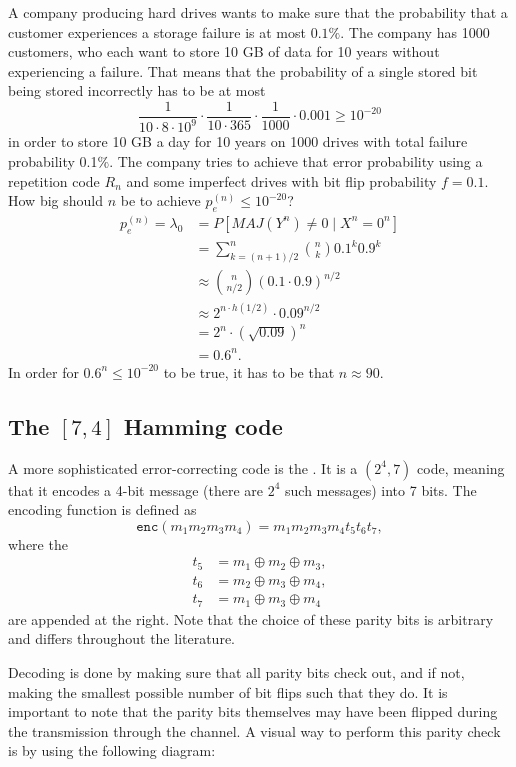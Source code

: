 \begin{example}
A company producing hard drives wants to make sure that the probability that a customer experiences a storage failure is at most $0.1\%$. The company has 1000 customers, who each want to store 10 GB of data for 10 years without experiencing a failure. That means that the probability of a single stored bit being stored incorrectly has to be at most
\[
\frac{1}{10 \cdot 8 \cdot 10^9} \cdot \frac{1}{10 \cdot 365} \cdot \frac{1}{1000} \cdot 0.001 \geq 10^{-20}
\]
in order to store 10 GB a day for 10 years on 1000 drives with total failure probability 0.1$\%$. The company tries to achieve that error probability using a repetition code $R_n$ and some imperfect drives with bit flip probability $f = 0.1$. How big should $n$ be to achieve $p_e^{(n)} \leq 10^{-20}$?
\begin{align*}
p_e^{(n)} = \lambda_0 &= P[MAJ(Y^n) \neq 0 \mid X^n = 0^n]\\
&= \sum_{k = (n+1)/2}^n {n \choose k} 0.1^k 0.9^k\\
&\approx {n \choose n/2} \left(0.1\cdot 0.9\right)^{n/2}\\
&\approx 2^{n\cdot h(1/2)} \cdot 0.09^{n/2}\\
&= 2^n \cdot \left(\sqrt{0.09}\right)^n\\
&= 0.6^n.
\end{align*}
In order for $0.6^n \leq 10^{-20}$ to be true, it has to be that $n \approx 90$.
\end{example}


\subsection{The $[7,4]$ Hamming code}
A more sophisticated error-correcting code is the . It is a $(2^4,7)$ code, meaning that it encodes a 4-bit message (there are $2^4$ such messages) into 7 bits. The encoding function is defined as
\[
\mathtt{enc}(m_1m_2m_3m_4) = m_1m_2m_3m_4t_5t_6t_7,
\]
where the 
\begin{align*}
t_5 &= m_1 \oplus m_2 \oplus m_3,\\
t_6 &= m_2 \oplus m_3 \oplus m_4,\\
t_7 &= m_1 \oplus m_3 \oplus m_4
\end{align*}
are appended at the right. Note that the choice of these parity bits is arbitrary and differs throughout the literature.

Decoding is done by making sure that all parity bits check out, and if not, making the smallest possible number of bit flips such that they do. It is important to note that the parity bits themselves may have been flipped during the transmission through the channel. A visual way to perform this parity check is by using the following diagram:


